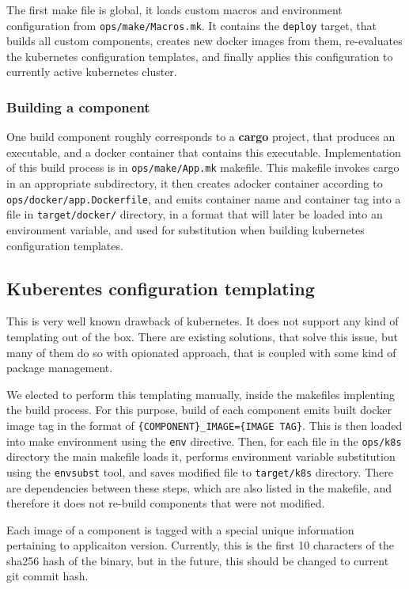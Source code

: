 The first make file is global, it loads custom macros and environment configuration from \verb|ops/make/Macros.mk|.
It contains the \verb|deploy| target, that builds all custom components, creates new docker images from them,
re-evaluates the kubernetes configuration templates, and finally applies this configuration to currently active kubernetes cluster.

\subsubsection{Building a component}
One build component roughly corresponds to a \textbf{cargo} project, that produces an executable, and a docker container
that contains this executable. Implementation of this build process is in \verb|ops/make/App.mk| makefile. This makefile
invokes cargo in an appropriate subdirectory, it then creates adocker container according to \verb|ops/docker/app.Dockerfile|,
and emits container name and container tag into a file in \verb|target/docker/| directory, in a format
that will later be loaded into an environment variable, and used for substitution when building kubernetes
configuration templates.

\subsection{Kuberentes configuration templating}
This is very well known drawback of kubernetes. It does not support any kind of templating out of the box.
There are existing solutions, that solve this issue, but many of them do so with opionated approach, that is coupled
with some kind of package management.

We elected to perform this templating manually, inside the makefiles implenting the build process. For this purpose,
build of each component emits built docker image tag in the format of \verb|{COMPONENT}_IMAGE={IMAGE TAG}|.
This is then loaded into make environment using the \verb|env| directive. Then, for each file in the \verb|ops/k8s| directory
the main makefile loads it, performs environment variable substitution using the \verb|envsubst| tool, and saves modified
file to \verb|target/k8s| directory. There are dependencies between these steps, which are also listed in the makefile, and
therefore it does not re-build components that were not modified.

Each image of a component is tagged with a special unique information pertaining to applicaiton version. Currently,
this is the first 10 characters of the sha256 hash of the binary, but in the future, this should be changed to current
git commit hash.

